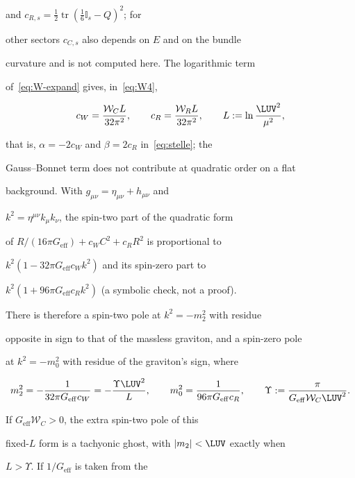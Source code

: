 and \(c_{R,s}=\tfrac12\operatorname{tr}(\tfrac16\mathbb I_s-Q)^2\); for

other sectors \(c_{C,s}\) also depends on \(E\) and on the bundle

curvature and is not computed here. The logarithmic term

of~\eqref{eq:W-expand} gives, in~\eqref{eq:W4},

\[

  c_W=\frac{\mathcal W_C L}{32\pi^2},\qquad

  c_R=\frac{\mathcal W_R L}{32\pi^2},\qquad

  L:=\ln\frac{\LUV^2}{\mu^2},

\]

that is, \(\alpha=-2c_W\) and \(\beta=2c_R\) in~\eqref{eq:stelle}; the

Gauss--Bonnet term does not contribute at quadratic order on a flat

background. With \(g_{\mu\nu}=\eta_{\mu\nu}+h_{\mu\nu}\) and

\(k^2=\eta^{\mu\nu}k_\mu k_\nu\), the spin-two part of the quadratic form

of \(R/(16\pi G_{\mathrm{eff}})+c_WC^2+c_RR^2\) is proportional to

\(k^2(1-32\pi G_{\mathrm{eff}}c_Wk^2)\) and its spin-zero part to

\(k^2(1+96\pi G_{\mathrm{eff}}c_Rk^2)\) (a symbolic check, not a proof).

There is therefore a spin-two pole at \(k^2=-m_2^2\) with residue

opposite in sign to that of the massless graviton, and a spin-zero pole

at \(k^2=-m_0^2\) with residue of the graviton's sign, where

\[

  m_2^2=-\frac{1}{32\pi G_{\mathrm{eff}}c_W}

       =-\frac{\Upsilon\LUV^2}{L},

  \qquad

  m_0^2=\frac{1}{96\pi G_{\mathrm{eff}}c_R},

  \qquad

  \Upsilon:=\frac{\pi}{G_{\mathrm{eff}}\mathcal W_C\LUV^2}.

\]

If \(G_{\mathrm{eff}}\mathcal W_C>0\), the extra spin-two pole of this

fixed-\(L\) form is a tachyonic ghost, with \(|m_2|<\LUV\) exactly when

\(L>\Upsilon\). If \(1/G_{\mathrm{eff}}\) is taken from the

